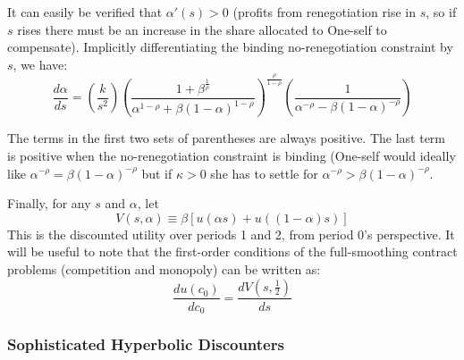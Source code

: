 \documentclass[11pt,english]{article}
\theoremstyle{plain}
\theoremstyle{definition}
\begin{document}
It can easily be verified that $\alpha'\left(s\right)>0$ (profits
from renegotiation rise in $s$, so if $s$ rises there must be an
increase in the share allocated to One-self to compensate). Implicitly
differentiating the binding no-renegotiation constraint by $s$, we
have: 
\begin{equation}
\frac{d\alpha}{ds}=\left(\frac{k}{s^{2}}\right)\left(\frac{1+\beta^{\frac{1}{\rho}}}{\alpha^{1-\rho}+\beta\left(1-\alpha\right)^{1-\rho}}\right)^{\frac{\rho}{1-\rho}}\left(\frac{1}{\alpha^{-\rho}-\beta\left(1-\alpha\right)^{-\rho}}\right)\label{eq:dalpha-ds}
\end{equation}

The terms in the first two sets of parentheses are always positive.
The last term is positive when the no-renegotiation constraint is
binding (One-self would ideally like $\alpha^{-\rho}=\beta\left(1-\alpha\right)^{-\rho}$
but if $\kappa>0$ she has to settle for $\alpha^{-\rho}>\beta\left(1-\alpha\right)^{-\rho}$.

Finally, for any $s$ and $\alpha$, let 
\begin{equation}
V\left(s,\alpha\right)\equiv\beta\left[u\left(\alpha s\right)+u\left(\left(1-\alpha\right)s\right)\right]\label{eq:cont-utility}
\end{equation}
This is the discounted utility over periods 1 and 2, from period 0's
perspective. It will be useful to note that the first-order conditions
of the full-smoothing contract problems (competition and monopoly)
can be written as: 
\begin{equation}
\frac{du\left(c_{0}\right)}{dc_{0}}=\frac{dV\left(s,\frac{1}{2}\right)}{ds}\label{eq:FOC-with-V}
\end{equation}


\subsubsection{Sophisticated Hyperbolic Discounters}
\end{document}

